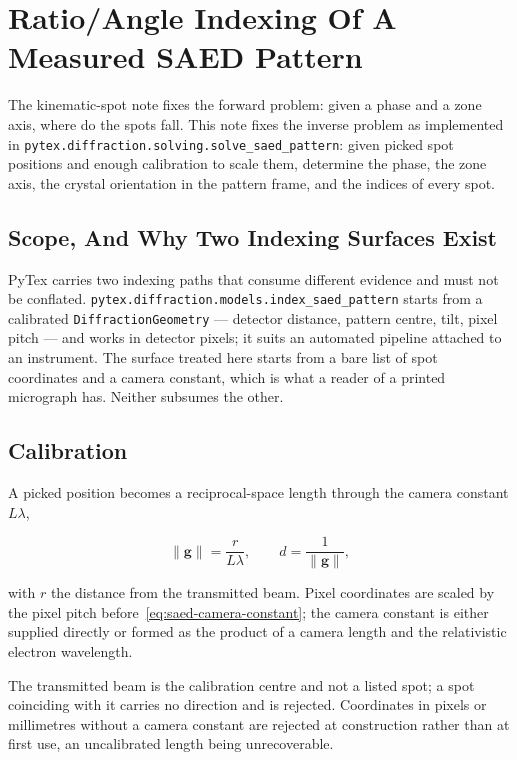 \section{Ratio/Angle Indexing Of A Measured SAED Pattern}

The kinematic-spot note fixes the forward problem: given a phase and a zone axis, where do the
spots fall. This note fixes the inverse problem as implemented in
\texttt{pytex.diffraction.solving.solve\_saed\_pattern}: given picked spot positions and enough
calibration to scale them, determine the phase, the zone axis, the crystal orientation in the
pattern frame, and the indices of every spot.

\subsection{Scope, And Why Two Indexing Surfaces Exist}

PyTex carries two indexing paths that consume different evidence and must not be conflated.
\texttt{pytex.diffraction.models.index\_saed\_pattern} starts from a calibrated
\texttt{DiffractionGeometry} --- detector distance, pattern centre, tilt, pixel pitch --- and works
in detector pixels; it suits an automated pipeline attached to an instrument. The surface treated
here starts from a bare list of spot coordinates and a camera constant, which is what a reader of
a printed micrograph has. Neither subsumes the other.

\subsection{Calibration}

A picked position becomes a reciprocal-space length through the camera constant $L\lambda$,

\begin{equation}
\lVert \mathbf{g} \rVert = \frac{r}{L\lambda},
\qquad
d = \frac{1}{\lVert \mathbf{g} \rVert},
\label{eq:saed-camera-constant}
\end{equation}

with $r$ the distance from the transmitted beam. Pixel coordinates are scaled by the pixel pitch
before~\eqref{eq:saed-camera-constant}; the camera constant is either supplied directly or formed
as the product of a camera length and the relativistic electron wavelength.

The transmitted beam is the calibration centre and not a listed spot; a spot coinciding with it
carries no direction and is rejected. Coordinates in pixels or millimetres without a camera
constant are rejected at construction rather than at first use, an uncalibrated length being
unrecoverable.

